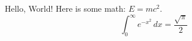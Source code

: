 \documentclass{article}
\begin{document}
Hello, World! Here is some math: \( E = mc^2 \).
\[
\int_0^\infty e^{-x^2} \, dx = \frac{\sqrt{\pi}}{2}
\]
\end{document}
